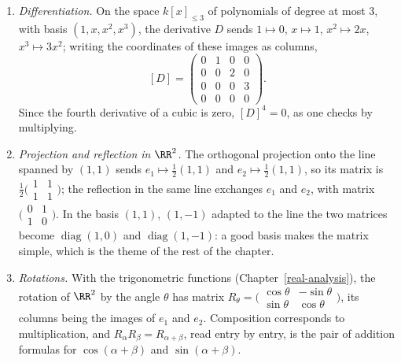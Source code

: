 \begin{example}\label{linear-algebra:example-matrices}
\begin{enumerate}
\item \emph{Differentiation.} On the space $k[x]_{\leq 3}$ of polynomials of degree at most $3$, with basis $(1, x, x^2, x^3)$, the derivative $D$ sends $1 \mapsto 0$, $x \mapsto 1$, $x^2 \mapsto 2x$,
$x^3 \mapsto 3x^2$; writing the coordinates of these images as columns,
\[
[D] = \begin{pmatrix}0 & 1 & 0 & 0\\ 0 & 0 & 2 & 0\\ 0 & 0 & 0 & 3\\ 0 & 0 & 0 & 0\end{pmatrix}.
\]
Since the fourth derivative of a cubic is zero, $[D]^4 = 0$, as one checks by multiplying.
\item \emph{Projection and reflection in $\RR^2$.} The orthogonal projection onto the line spanned by $(1, 1)$ sends $e_1 \mapsto \frac12(1, 1)$ and $e_2 \mapsto \frac12(1, 1)$, so its matrix is
$\frac12\bigl(\begin{smallmatrix}1 & 1\\ 1 & 1\end{smallmatrix}\bigr)$; the reflection in the same line exchanges $e_1$ and $e_2$, with matrix $\bigl(\begin{smallmatrix}0 & 1\\ 1 & 0\end{smallmatrix}\bigr)$.
In the basis $(1, 1)$, $(1, -1)$ adapted to the line the two matrices become $\operatorname{diag}(1, 0)$ and $\operatorname{diag}(1, -1)$: a good basis makes the matrix simple, which is the theme of the
rest of the chapter.
\item \emph{Rotations.} With the trigonometric functions (Chapter~\ref{real-analysis}), the rotation of $\RR^2$ by the angle $\theta$ has matrix
$R_\theta = \bigl(\begin{smallmatrix}\cos\theta & -\sin\theta\\ \sin\theta & \cos\theta\end{smallmatrix}\bigr)$, its columns being the images of $e_1$ and $e_2$. Composition corresponds to multiplication,
and $R_\alpha R_\beta = R_{\alpha+\beta}$, read entry by entry, is the pair of addition formulas for $\cos(\alpha + \beta)$ and $\sin(\alpha + \beta)$.
\end{enumerate}
\end{example}

